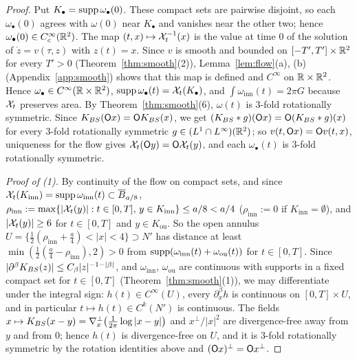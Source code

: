 \begin{proof}
Put $K_\bullet=\operatorname{supp}\omega_\bullet(0)$. These compact sets are pairwise
disjoint, so each $\omega_\bullet(0)$ agrees with $\omega(0)$ near $K_\bullet$ and
vanishes near the other two; hence $\omega_\bullet(0)\in C_c^\infty(\mathbb{R}^2)$. The
map $(t,x)\mapsto\mathcal{X}_t^{-1}(x)$ is the value at time $0$ of the solution of
$\dot z=v(\tau,z)$ with $z(t)=x$. Since $v$ is smooth and bounded on
$[-T',T']\times\mathbb{R}^2$ for every $T'>0$ (Theorem~\ref{thm:smooth}\textup{(2)}),
Lemma~\ref{lem:flow}\textup{(a)}, \textup{(b)} (Appendix~\ref{app:smooth}) shows that this map
is defined and
$C^\infty$ on $\mathbb{R}\times\mathbb{R}^2$. Hence $\omega_\bullet\in C^\infty(\mathbb{R}\times\mathbb{R}^2)$,
$\operatorname{supp}\omega_\bullet(t)=\mathcal{X}_t(K_\bullet)$, and $\int\omega_{\mathrm{inn}}(t)=2\pi G$
because $\mathcal{X}_t$ preserves area. By Theorem~\ref{thm:smooth}\textup{(6)},
$\omega(t)$ is $3$-fold rotationally symmetric. Since $K_{BS}(\mathsf{O} x)=\mathsf{O}K_{BS}(x)$, we get
$(K_{BS}\ast g)(\mathsf{O} x)=\mathsf{O}(K_{BS}\ast g)(x)$ for every $3$-fold rotationally symmetric
$g\in (L^1\cap L^\infty)(\mathbb{R}^2)$; so $v(t,\mathsf{O} x)=\mathsf{O} v(t,x)$, uniqueness for the flow
gives $\mathcal{X}_t(\mathsf{O} y)=\mathsf{O}\mathcal{X}_t(y)$, and each $\omega_\bullet(t)$ is $3$-fold
rotationally symmetric.

\emph{Proof of (1).} By continuity of the flow on compact sets, and since
$\mathcal{X}_t(K_{\mathrm{inn}})=\operatorname{supp}\omega_{\mathrm{inn}}(t)\subset\overline B_{a/8}$,
$\rho_{\mathrm{inn}}:=\max\{|\mathcal{X}_t(y)|:t\in[0,T],\,y\in K_{\mathrm{inn}}\}\le a/8<a/4$
($\rho_{\mathrm{inn}}:=0$ if $K_{\mathrm{inn}}=\emptyset$), and $|\mathcal{X}_t(y)|\ge6$ for
$t\in[0,T]$ and $y\in K_{\mathrm{ou}}$. So the open annulus
$U=\{\frac12(\rho_{\mathrm{inn}}+\frac a4)<|x|<4\}\supset N'$ has distance at least
$\min(\frac12(\frac a4-\rho_{\mathrm{inn}}),2)>0$ from
$\operatorname{supp}(\omega_{\mathrm{inn}}(t)+\omega_{\mathrm{ou}}(t))$ for $t\in[0,T]$. Since
$|\partial^\beta K_{BS}(z)|\le C_\beta|z|^{-1-|\beta|}$, and $\omega_{\mathrm{inn}}$,
$\omega_{\mathrm{ou}}$ are continuous with supports in a fixed compact set for
$t\in[0,T]$ (Theorem~\ref{thm:smooth}\textup{(1)}), we may differentiate under the
integral sign: $h(t)\in C^\infty(U)$, every $\partial^\beta_xh$ is continuous on
$[0,T]\times U$, and in particular $t\mapsto h(t)\in C^k(N')$ is continuous. The
fields $x\mapsto K_{BS}(x-y)=\nabla^\perp_x\big(\frac1{2\pi}\log|x-y|\big)$ and
$x^\perp/|x|^2$ are divergence-free away from $y$ and from $0$; hence
$h(t)$ is divergence-free on $U$, and it is $3$-fold rotationally symmetric by the rotation identities above and
$(\mathsf{O} x)^\perp=\mathsf{O} x^\perp$.


\end{proof}
